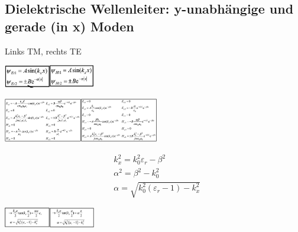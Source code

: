 \documentclass[english]{latex4ei/latex4ei_sheet}
\begin{document}
\begin{sectionbox}
    \subsection{Dielektrische Wellenleiter: y-unabhängige und gerade (in x) Moden}
    Links TM, rechts TE\\
    \begin{center}\includegraphics[width = 2cm]{./img/dielektr-gtm.png}\includegraphics[width = 2cm]{./img/dielektr-gte.png}\end{center}
    \begin{center}\includegraphics[width = 3.4cm]{./img/dielektr-gtm2.png}\includegraphics[width = 3.4cm]{./img/dielektr-gte2.png}\end{center}
    $$\begin{aligned}
             & k_{x}^{2}=k_{0}^{2} \varepsilon_{r}-\beta^{2}                   \\
             & \alpha^{2}=\beta^{2}-k_{0}^{2}                                  \\
             & \alpha=\sqrt{k_{0}^{2}\left(\varepsilon_{r}-1\right)-k_{x}^{2}}
        \end{aligned}$$
    \begin{center}\includegraphics[width = 2cm]{./img/dielektr-gtm3.png}\includegraphics[width = 2cm]{./img/dielektr-gte3.png}\end{center}

\end{sectionbox}
\end{document}
